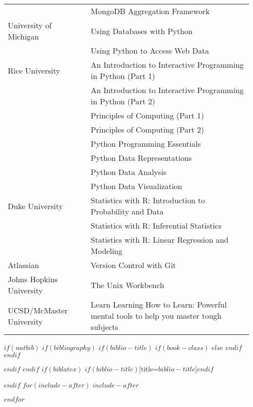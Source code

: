 \documentclass[$if(fontsize)$$fontsize$,$endif$$if(lang)$$babel-lang$,$endif$$if(papersize)$$papersize$paper,$endif$$for(classoption)$$classoption$$sep$,$endfor$]{$documentclass$}
\begin{document}
\begin{longtable}[c]{|p{4.5cm}|p{14.5cm}|}
                            & MongoDB Aggregation Framework                                        \\
  University of Michigan    & Using Databases with Python                                          \\
                            & Using Python to Access Web Data                                      \\
  \midrule
  Rice University           & An Introduction to Interactive Programming in Python (Part 1)        \\
                            & An Introduction to Interactive Programming in Python (Part 2)        \\
                            & Principles of Computing (Part 1)                                     \\
                            & Principles of Computing (Part 2)                                     \\
                            & Python Programming Essentials                                        \\
                            & Python Data Representations                                          \\
                            & Python Data Analysis                                                 \\
                            & Python Data Visualization                                            \\
  \midrule
  Duke University           & Statistics with R: Introduction to Probability and Data              \\
                            & Statistics with R: Inferential Statistics                            \\
                            & Statistics with R: Linear Regression and Modeling                    \\
  \midrule
  Atlassian                 & Version Control with Git                                             \\
  Johns Hopkins University  & The Unix Workbench                                                   \\
  UCSD/McMaster University  & Learn Learning How to Learn: Powerful mental tools to help you master tough subjects \\
  \bottomrule
\end{longtable}



$if(natbib)$
$if(bibliography)$
$if(biblio-title)$
$if(book-class)$
\renewcommand\bibname{$biblio-title$}
$else$
\renewcommand\refname{$biblio-title$}
$endif$
$endif$


$endif$
$endif$
$if(biblatex)$
\printbibliography$if(biblio-title)$[title=$biblio-title$]$endif$

$endif$
$for(include-after)$
$include-after$

$endfor$
\end{document}
